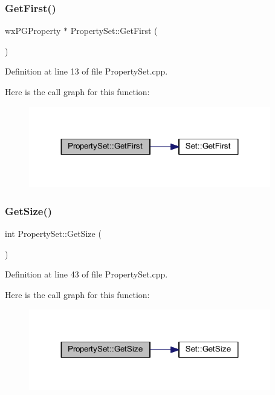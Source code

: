 \subsubsection{\texorpdfstring{Get\+First()}{GetFirst()}}
{\footnotesize\ttfamily wx\+P\+G\+Property $\ast$ Property\+Set\+::\+Get\+First (\begin{DoxyParamCaption}{ }\end{DoxyParamCaption})}



Definition at line 13 of file Property\+Set.\+cpp.

Here is the call graph for this function\+:\nopagebreak
\begin{figure}[H]
\begin{center}
\leavevmode
\includegraphics[width=299pt]{class_property_set_aece224749884f449d1afda598d468b41_cgraph}
\end{center}
\end{figure}
\mbox{\label{class_property_set_abbc61ecb91ccb481ea4597e7d4c4be9b}} 
\subsubsection{\texorpdfstring{Get\+Size()}{GetSize()}}
{\footnotesize\ttfamily int Property\+Set\+::\+Get\+Size (\begin{DoxyParamCaption}{ }\end{DoxyParamCaption})}



Definition at line 43 of file Property\+Set.\+cpp.

Here is the call graph for this function\+:\nopagebreak
\begin{figure}[H]
\begin{center}
\leavevmode
\includegraphics[width=299pt]{class_property_set_abbc61ecb91ccb481ea4597e7d4c4be9b_cgraph}
\end{center}
\end{figure}
\mbox{\label{class_property_set_affec0e3a12cfab591a5ea8821244aa60}} 
